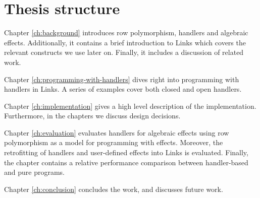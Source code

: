 \section{Thesis structure}
Chapter \ref{ch:background} introduces row polymorphism, handlers and algebraic effects. Additionally, it contains a brief introduction to Links which covers the relevant constructs we use later on. Finally, it includes a discussion of related work.

Chapter \ref{ch:programming-with-handlers} dives right into programming with handlers in Links. A series of examples cover both closed and open handlers.

Chapter \ref{ch:implementation} gives a high level description of the implementation. Furthermore, in the chapters we discuss design decisions.

Chapter \ref{ch:evaluation} evaluates handlers for algebraic effects using row polymorphism as a model for programming with effects. Moreover, the retrofitting of handlers and user-defined effects into Links is evaluated. Finally, the chapter contains a relative performance comparison between handler-based and pure programs.

Chapter \ref{ch:conclusion} concludes the work, and discusses future work.